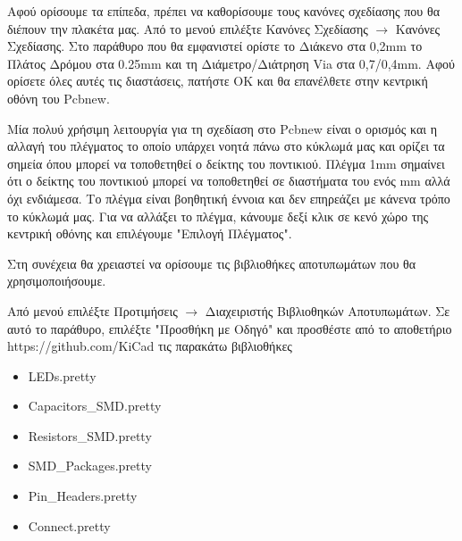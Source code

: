 \documentclass[a4paper]{article}
\begin{document}
Αφού ορίσουμε τα επίπεδα, πρέπει να καθορίσουμε τους κανόνες σχεδίασης που θα διέπουν την πλακέτα μας. Από το μενού επιλέξτε Κανόνες Σχεδίασης $\rightarrow$ Κανόνες Σχεδίασης. Στο παράθυρο που θα εμφανιστεί ορίστε το Διάκενο στα 0,2mm το Πλάτος Δρόμου στα 0.25mm και τη Διάμετρο/Διάτρηση Via στα 0,7/0,4mm. Αφού ορίσετε όλες αυτές τις διαστάσεις, πατήστε ΟΚ και θα επανέλθετε στην κεντρική οθόνη του \textenglish{Pcbnew}.

\begin{figure}
  \begin{center}
    \label{fig:kicad-main}
  \end{center}
\end{figure}


Μία πολυύ χρήσιμη λειτουργία για τη σχεδίαση στο \textenglish{Pcbnew} είναι ο ορισμός και η αλλαγή του πλέγματος το οποίο υπάρχει νοητά πάνω στο κύκλωμά μας και ορίζει τα σημεία όπου μπορεί να τοποθετηθεί ο δείκτης του ποντικιού. Πλέγμα 1mm σημαίνει ότι ο δείκτης του ποντικιού μπορεί να τοποθετηθεί σε διαστήματα του ενός mm αλλά όχι ενδιάμεσα. Το πλέγμα είναι βοηθητική έννοια και δεν επηρεάζει με κάνενα τρόπο το κύκλωμά μας. Για να αλλάξει το πλέγμα, κάνουμε δεξί κλικ σε κενό χώρο της κεντρική οθόνης και επιλέγουμε "Επιλογή Πλέγματος".


Στη συνέχεια θα χρειαστεί να ορίσουμε τις βιβλιοθήκες αποτυπωμάτων που θα χρησιμοποιήσουμε. 

Από μενού επιλέξτε Προτιμήσεις $\rightarrow$ Διαχειριστής Βιβλιοθηκών Αποτυπωμάτων. Σε αυτό το παράθυρο, επιλέξτε "Προσθήκη με Οδηγό" και προσθέστε από το αποθετήριο https://github.com/KiCad τις παρακάτω βιβλιοθήκες 

\begin{itemize}
    \item \textenglish{LED}s.pretty
    \item Capacitors\_SMD.pretty
    \item Resistors\_SMD.pretty
    \item SMD\_Packages.pretty
    \item Pin\_Headers.pretty
    \item Connect.pretty
\end{itemize}
\end{document}
